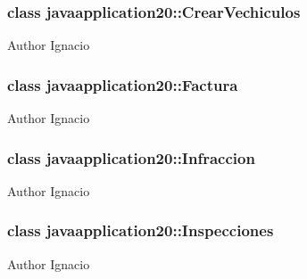 \subsubsection{class javaapplication20\+:\+:Crear\+Vechiculos}
\begin{DoxyAuthor}{Author}
Ignacio 
\end{DoxyAuthor}
\label{classjavaapplication20_1_1_factura}
\subsubsection{class javaapplication20\+:\+:Factura}
\begin{DoxyAuthor}{Author}
Ignacio 
\end{DoxyAuthor}
\label{classjavaapplication20_1_1_infraccion}
\subsubsection{class javaapplication20\+:\+:Infraccion}
\begin{DoxyAuthor}{Author}
Ignacio 
\end{DoxyAuthor}
\label{classjavaapplication20_1_1_inspecciones}
\subsubsection{class javaapplication20\+:\+:Inspecciones}
\begin{DoxyAuthor}{Author}
Ignacio 
\end{DoxyAuthor}
